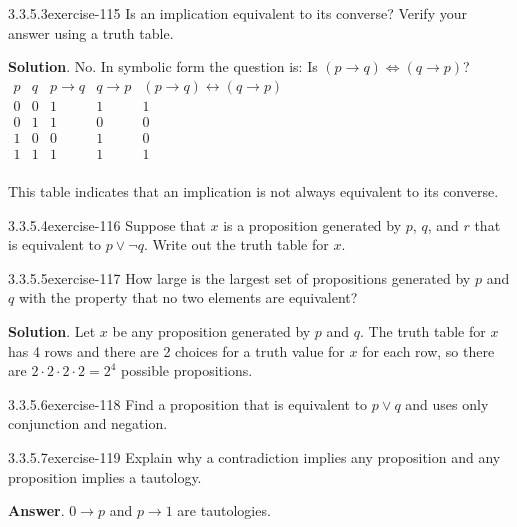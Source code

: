 \documentclass[twoside,10pt,]{book}
\numberwithin{equation}{section}
\begin{document}
\begin{divisionsolution}{3.3.5.3}{}{exercise-115}%
\hypertarget{p-1036}{}%
Is an implication equivalent to its converse? Verify your answer using a truth table.%
\par\smallskip%
\noindent\textbf{Solution}.\quad%
\hypertarget{p-1037}{}%
No. In symbolic form the question is: Is \((p\to q)\Leftrightarrow (q\to p)\)? \(\begin{array}{ccccc}
p & q  & p\to q  & q\to p  & (p\to q)\leftrightarrow (q\to p) \\
\hline
0 & 0 & 1 & 1 & 1\\
0 & 1 & 1 & 0 & 0\\
1 & 0 & 0 & 1 & 0 \\
1 & 1 & 1 & 1 & 1 \\
\end{array}\)%
\par
\hypertarget{p-1038}{}%
This table indicates that an implication is not always equivalent to its converse.%
\end{divisionsolution}%
\begin{divisionsolution}{3.3.5.4}{}{exercise-116}%
\hypertarget{p-1039}{}%
Suppose that \(x\) is a proposition generated by \(p\), \(q\), and \(r\) that is equivalent to \(p \lor  \neg q\). Write out the truth table for \(x\).%
\end{divisionsolution}%
\begin{divisionsolution}{3.3.5.5}{}{exercise-117}%
\hypertarget{p-1040}{}%
How large is the largest set of propositions generated by \(p\) and \(q\) with the property that no two elements are equivalent?%
\par\smallskip%
\noindent\textbf{Solution}.\quad%
\hypertarget{p-1041}{}%
Let \(x\) be any proposition generated by \(p\) and \(q\). The truth table for \(x\) has 4 rows and there are 2 choices for a truth value for \(x\) for each row, so there are \(2\cdot 2\cdot 2\cdot 2=2^4\) possible propositions.%
\end{divisionsolution}%
\begin{divisionsolution}{3.3.5.6}{}{exercise-118}%
\hypertarget{p-1042}{}%
Find a proposition that is equivalent to \(p \lor  q\) and uses only conjunction and negation.%
\end{divisionsolution}%
\begin{divisionsolution}{3.3.5.7}{}{exercise-119}%
\hypertarget{p-1043}{}%
Explain why a contradiction implies any proposition and any proposition implies a tautology.%
\par\smallskip%
\noindent\textbf{Answer}.\quad%
\hypertarget{p-1044}{}%
\(0\to p\) and \(p\to 1\) are tautologies.%
\end{divisionsolution}%
\end{document}
